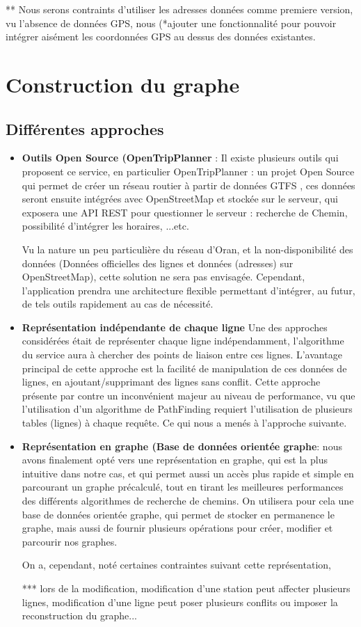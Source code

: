 ** Nous serons contraints d'utiliser les adresses données comme premiere version, vu l'absence de données GPS, nous (*ajouter une fonctionnalité pour pouvoir intégrer aisément les coordonnées GPS au dessus des données existantes.

\section{Construction du graphe}
\subsection{Différentes approches}
\begin{itemize}
	\item \textbf{Outils Open Source (OpenTripPlanner} : 
	      Il existe plusieurs outils qui proposent ce service, en particulier OpenTripPlanner : un projet Open Source qui permet de créer un réseau routier à partir de données GTFS , ces données seront ensuite intégrées avec OpenStreetMap et stockée sur le serveur, qui exposera une API REST pour questionner le serveur : recherche de Chemin, possibilité d'intégrer les horaires, ...etc.
	      		
	      Vu la nature un peu particulière du réseau d'Oran, et la non-disponibilité des données (Données officielles des lignes et données (adresses) sur OpenStreetMap), cette solution ne sera pas envisagée. 
	      Cependant, l'application prendra une architecture flexible permettant d'intégrer, au futur, de tels outils rapidement au cas de nécessité.
	\item \textbf{Représentation indépendante de chaque ligne}
	      Une des approches considérées était de représenter chaque ligne indépendamment, l'algorithme du service aura à chercher des points de liaison entre ces lignes.
	      L'avantage principal de cette approche est la facilité de manipulation de ces données de lignes, en ajoutant/supprimant des lignes sans conflit.
	      Cette approche présente par contre un inconvénient majeur au niveau de performance, vu que l'utilisation d'un algorithme de PathFinding requiert l'utilisation de plusieurs tables (lignes) à chaque requête. Ce qui nous a menés à l'approche suivante.
	\item \textbf{Représentation en graphe (Base de données orientée graphe}: nous avons finalement opté vers une représentation en graphe, qui est la plus intuitive dans notre cas, et qui permet aussi un accès plus rapide et simple en parcourant un graphe précalculé, tout en tirant les meilleures performances des différents algorithmes de recherche de chemins.
	On utilisera pour cela une base de données orientée graphe, qui permet de stocker en permanence le graphe, mais aussi de fournir plusieurs opérations pour créer, modifier et parcourir nos graphes.
	
	On a, cependant, noté certaines contraintes suivant cette représentation, 
	
	*** lors de la modification, modification d'une station peut affecter plusieurs lignes, modification d'une ligne peut poser plusieurs conflits ou imposer la reconstruction du graphe...
	     
\end{itemize}
